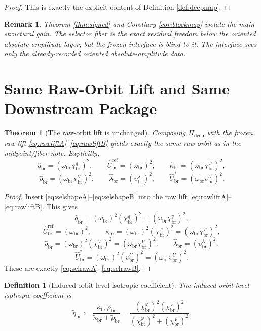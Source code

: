 \documentclass[11pt]{article}
\newcommand{\RespShapeCov}{\widetilde\kappa_{\mathrm{br}}}
\newcommand{\RespShapeRelax}{\widetilde\rho_{\mathrm{br}}}
\newcommand{\RespShapeIso}{\widetilde\eta_{\mathrm{br}}}
\newcommand{\RespRawReadout}{\widehat q_{\mathrm{br}}}
\newcommand{\RespRawRef}{\widehat U_{\mathrm{br}}^{\mathrm{ref}}}
\newcommand{\RespRawCov}{\widehat\kappa_{\mathrm{br}}}
\newcommand{\RespRawRelax}{\widehat\rho_{\mathrm{br}}}
\newcommand{\RespRawWell}{\widehat\lambda_{\mathrm{br}}}
\newcommand{\RespRawEq}{\widehat U_{\mathrm{br}}^{\ast}}
\newcommand{\AbsReadAmp}{\chi_{\mathrm{br}}^{q}}
\newcommand{\AbsCovAmp}{\chi_{\mathrm{br}}^{\varphi}}
\newcommand{\AbsRelaxAmp}{\chi_{\mathrm{br}}^{V}}
\newcommand{\AbsWellAmp}{\upsilon_{\mathrm{br}}^{\lambda}}
\newcommand{\AbsEqAmp}{\upsilon_{\mathrm{br}}^{U}}
\newcommand{\AbsScaleAmp}{\omega_{\mathrm{br}}}
\newcommand{\DeepMap}{\Pi_{\mathrm{deep}}}
\newtheorem{definition}{Definition}
\newtheorem{remark}{Remark}
\newtheorem{theorem}{Theorem}
\begin{document}
\begin{proof}
This is exactly the explicit content of Definition \ref{def:deepmap}.
\end{proof}

\begin{remark}
Theorem \ref{thm:signed} and Corollary \ref{cor:blockmap} isolate the main structural gain. The selector fiber is the exact residual freedom below the oriented absolute-amplitude layer, but the frozen interface is blind to it. The interface sees only the already-recorded oriented absolute-amplitude data.
\end{remark}

\section{Same Raw-Orbit Lift and Same Downstream Package}

\begin{theorem}[The raw-orbit lift is unchanged]
\label{thm:rawlift}
Composing \(\DeepMap\) with the frozen raw lift \eqref{eq:rawliftA}--\eqref{eq:rawliftB} yields exactly the same raw orbit as in the midpoint/fiber note. Explicitly,
\begin{equation}
\RespRawReadout=(\AbsScaleAmp\AbsReadAmp)^{2},
\qquad
\RespRawRef=(\AbsScaleAmp)^{2},
\qquad
\RespRawCov=(\AbsScaleAmp\AbsCovAmp)^{2},
\label{eq:selrawA}
\end{equation}
\begin{equation}
\RespRawRelax=(\AbsScaleAmp\AbsRelaxAmp)^{2},
\qquad
\RespRawWell=(\AbsWellAmp)^{2},
\qquad
\RespRawEq=(\AbsScaleAmp\AbsEqAmp)^{2}.
\label{eq:selrawB}
\end{equation}
\end{theorem}

\begin{proof}
Insert \eqref{eq:selshapeA}--\eqref{eq:selshapeB} into the raw lift \eqref{eq:rawliftA}--\eqref{eq:rawliftB}. This gives
\[
\RespRawReadout=(\AbsScaleAmp)^{2}(\AbsReadAmp)^{2}=(\AbsScaleAmp\AbsReadAmp)^{2},
\]
\[
\RespRawRef=(\AbsScaleAmp)^{2},
\qquad
\RespRawCov=(\AbsScaleAmp)^{2}(\AbsCovAmp)^{2}=(\AbsScaleAmp\AbsCovAmp)^{2},
\]
\[
\RespRawRelax=(\AbsScaleAmp)^{2}(\AbsRelaxAmp)^{2}=(\AbsScaleAmp\AbsRelaxAmp)^{2},
\qquad
\RespRawWell=(\AbsWellAmp)^{2},
\]
\[
\RespRawEq=(\AbsScaleAmp)^{2}(\AbsEqAmp)^{2}=(\AbsScaleAmp\AbsEqAmp)^{2}.
\]
These are exactly \eqref{eq:selrawA}--\eqref{eq:selrawB}.
\end{proof}

\begin{definition}[Induced orbit-level isotropic coefficient]
\label{def:isocoeff}
The induced orbit-level isotropic coefficient is
\begin{equation}
\RespShapeIso
:=
\frac{\RespShapeCov\,\RespShapeRelax}{\RespShapeCov+\RespShapeRelax}
=
\frac{(\AbsCovAmp)^{2}(\AbsRelaxAmp)^{2}}{(\AbsCovAmp)^{2}+(\AbsRelaxAmp)^{2}}.
\label{eq:seliso}
\end{equation}
\end{definition}
\end{document}
